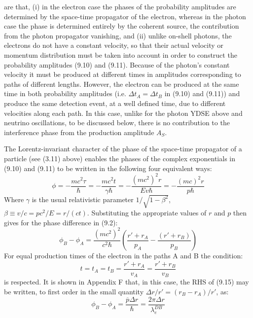 {     are that, (i) in the electron case the phases of the probability
   amplitudes are determined by the space-time propagator of the electron, whereas in the photon
    case the phase is determined entirely by the coherent source, the contribution from the
   photon propagator vanishing, and (ii) unlike on-shell photons, the electrons do not
    have a constant velocity, so that their actual  velocity or momentum distribution must be taken into
   account in order to construct the probability amplitudes (9.10) and (9.11).
     Because of the photon's constant velocity it must be produced at different 
    times in amplitudes corresponding to paths of different lengths. However, the electron
    can be produced at the same time in both probability amplitudes (i.e. $\Delta t_A = \Delta t_B$ in (9.10) and (9.11))
    and produce the same detection event, at a well defined time, due to different
   velocities along each path. In this case, unlike for the photon YDSE above and neutrino oscillations,
    to be discussed below, there is no contribution to the interference phase from the production
    amplitude $A_S$.
    \par The Lorentz-invariant character of the phase of the space-time propagator of a particle (see (3.11) above)
      enables the phases of the complex exponentials in (9.10) and (9.11) to be written in the following four
     equivalent ways:
  \begin{equation}
   \phi = -\frac{mc^2 \tau}{\hbar} = -\frac{mc^2 t}{ \gamma \hbar} = 
 -\frac{(mc^2)^2  r}{ E v \hbar} = -\frac{(mc)^2 r}{ p \hbar }
 \end{equation}
    Where $\gamma$ is the usual relativistic parameter $1/\sqrt{1-\beta^2}$, $\beta \equiv v/c = pc^2/E = r/(ct)$. 
   Substituting the appropriate values of $r$ and $p$ then gives for the phase difference in (9.2):
   \begin{equation}
   \phi_B -\phi_A = \frac{(mc^2)^2}{c^2 \hbar}\left(\frac{r'+r_A}{p_A}-\frac{(r'+r_B)}{p_B}\right)
   \end{equation}
    For equal production times of the electron in the paths A and B the condition:
   \begin{equation}
      t =   t_A = t_B =\frac{r'+r_A}{v_A} = \frac{r'+r_B}{v_B}
  \end{equation}
    is respected. It is shown in Appendix F that, in this case, the RHS of (9.15)
    may be written, to first order in the small quantity $\Delta r/r' = (r_B-r_A)/r'$, as:
      \begin{equation}
   \phi_B -\phi_A = \frac{\overline{p} \Delta r}{\hbar} =  \frac{2 \pi \Delta r}{ \lambda_e^{DB}}

\end{equation}}
